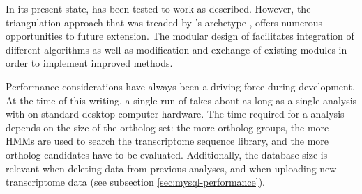 \label{sec:future-devel}
In its present state, \pname has been tested to work as described. However, the
triangulation approach that was treaded by \pname's archetype \hamstr, offers
numerous opportunities to future extension. The modular design of \pname
facilitates integration of different algorithms as well as modification and
exchange of existing modules in order to implement improved methods.

Performance considerations have always been a driving force during development.
At the time of this writing, a single run of \pname takes about as long as a
single analysis with \hamstr on standard desktop computer hardware. The time
required for a \pname analysis depends on the size of the ortholog set: the more
ortholog groups, the more HMMs are used to search the transcriptome sequence
library, and the more ortholog candidates have to be evaluated. Additionally,
the database size is relevant when deleting data from previous analyses, and
when uploading new transcriptome data (see subsection
\ref{sec:mysql-performance}). 
